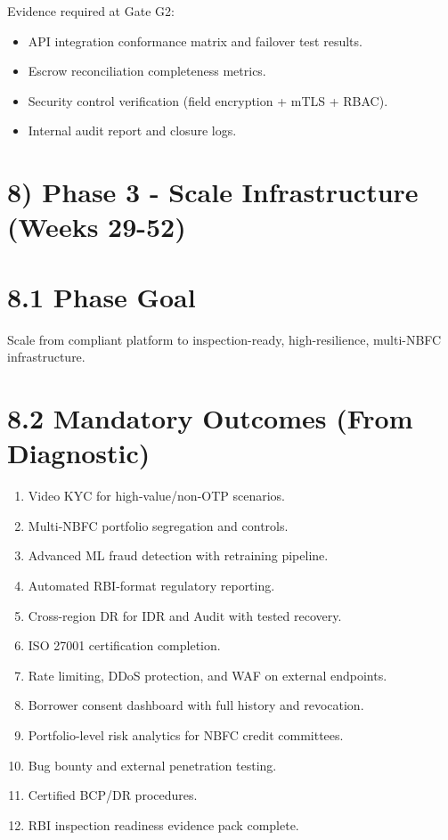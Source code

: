 ﻿\documentclass[12pt]{article}
\begin{document}
Evidence required at Gate G2:

\begin{itemize}
\item API integration conformance matrix and failover test results.
\item Escrow reconciliation completeness metrics.
\item Security control verification (field encryption + mTLS + RBAC).
\item Internal audit report and closure logs.
\end{itemize}

\section{8) Phase 3 - Scale Infrastructure (Weeks 29-52)}


\section{8.1 Phase Goal}


Scale from compliant platform to inspection-ready, high-resilience, multi-NBFC infrastructure.


\section{8.2 Mandatory Outcomes (From Diagnostic)}


\begin{enumerate}
\item Video KYC for high-value/non-OTP scenarios.
\item Multi-NBFC portfolio segregation and controls.
\item Advanced ML fraud detection with retraining pipeline.
\item Automated RBI-format regulatory reporting.
\item Cross-region DR for IDR and Audit with tested recovery.
\item ISO 27001 certification completion.
\item Rate limiting, DDoS protection, and WAF on external endpoints.
\item Borrower consent dashboard with full history and revocation.
\item Portfolio-level risk analytics for NBFC credit committees.
\item Bug bounty and external penetration testing.
\item Certified BCP/DR procedures.
\item RBI inspection readiness evidence pack complete.
\end{enumerate}
\end{document}
